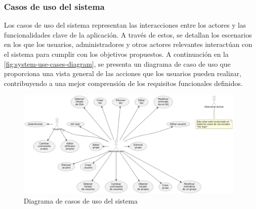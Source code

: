 \subsubsection{Casos de uso del sistema}

Los casos de uso del sistema representan las interacciones entre los actores y las funcionalidades clave de la aplicación. A través de estos, se detallan los escenarios en los que los usuarios, administradores y otros actores relevantes interactúan con el sistema para cumplir con los objetivos propuestos. A continuación en la \autoref{fig:system-use-cases-diagram}, se presenta un diagrama de caso de uso que proporciona una vista general de las acciones que los usuarios pueden realizar, contribuyendo a una mejor comprensión de los requisitos funcionales definidos.

\begin{figure}[h]
    \centering
    \includegraphics[width=\linewidth]{images/puml/system-diagram/system-diagram.png}
    \caption{Diagrama de casos de uso del sistema}
    \label{fig:system-use-cases-diagram}
\end{figure}